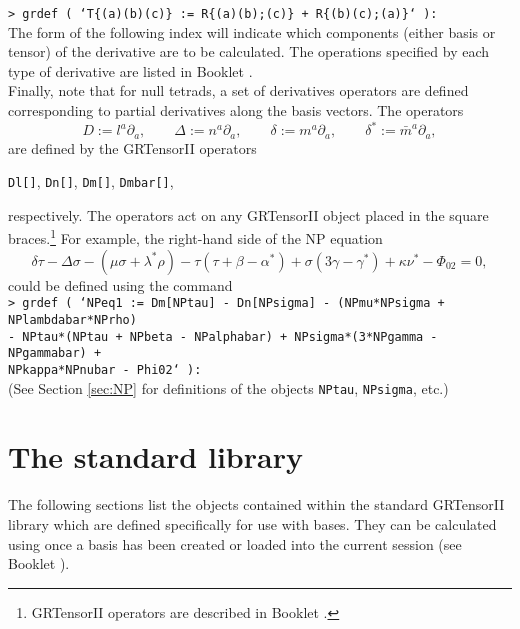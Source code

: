 \documentclass{article}
\begin{document}
\noindent\texttt{> grdef (
  `T\{(a)(b)(c)\} := R\{(a)(b);(c)\} + R\{(b)(c);(a)\}` ):}\\

\noindent The form of the following index will indicate which 
components (either basis or tensor) of the derivative are to be
calculated. The operations specified by each type of derivative are
listed in Booklet \grDefRef.\\

Finally, note that for null tetrads, a set of derivatives operators
are defined corresponding to partial derivatives along the basis
vectors. The operators
\[
  D := l^a\partial_a, \qquad \Delta := n^a\partial_a, \qquad
  \delta := m^a\partial_a, \qquad \delta^* := \bar{m}^a\partial_a,
\]
are defined by the GRTensorII operators
\begin{center}
  \texttt{Dl[]}, \qquad \texttt{Dn[]}, \qquad \texttt{Dm[]}, \qquad
  \texttt{Dmbar[]},
\end{center}
respectively. The operators act on any GRTensorII object placed in
the square braces.\footnote{GRTensorII operators are described in
Booklet \grCalcRef.} For example, the right-hand side of the
NP equation
\[
  \delta\tau - \Delta\sigma - (\mu\sigma + \lambda^*\rho)
    - \tau (\tau+\beta-\alpha^*) + \sigma (3\gamma-\gamma^*)
    + \kappa\nu^* - \Phi_{02} = 0,
\]
could be defined using the command\\

\noindent\texttt{> grdef ( `NPeq1 := Dm[NPtau] - Dn[NPsigma]
  - (NPmu*NPsigma + NPlambdabar*NPrho) \\
  \indent - NPtau*(NPtau + NPbeta - NPalphabar)
  + NPsigma*(3*NPgamma - NPgammabar) + \\
  \indent NPkappa*NPnubar - Phi02` ):}\\

\noindent (See Section \ref{sec:NP} for definitions of the objects
\texttt{NPtau}, \texttt{NPsigma}, etc.)
%
\section{The standard library} \label{sec:lib}
%
The following sections list the objects contained within the standard
GRTensorII library which are defined specifically for use with bases.
They can be calculated using  once a basis has been
created or loaded into the current session (see Booklet \grMakegRef).
\end{document}
